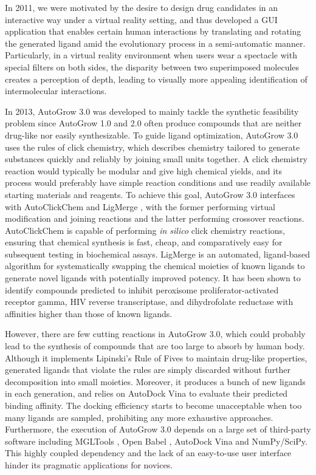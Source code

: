 In 2011, we were motivated by the desire to design drug candidates in an interactive way under a virtual reality setting, and thus developed a GUI application \citep{1265} that enables certain human interactions by translating and rotating the generated ligand amid the evolutionary process in a semi-automatic manner. Particularly, in a virtual reality environment when users wear a spectacle with special filters on both sides, the disparity between two superimposed molecules creates a perception of depth, leading to visually more appealing identification of intermolecular interactions.

In 2013, AutoGrow 3.0 \citep{1354} was developed to mainly tackle the synthetic feasibility problem since AutoGrow 1.0 and 2.0 often produce compounds that are neither drug-like nor easily synthesizable. To guide ligand optimization, AutoGrow 3.0 uses the rules of click chemistry, which describes chemistry tailored to generate substances quickly and reliably by joining small units together. A click chemistry reaction would typically be modular and give high chemical yields, and its process would preferably have simple reaction conditions and use readily available starting materials and reagents. To achieve this goal, AutoGrow 3.0 interfaces with AutoClickChem \citep{1051} and LigMerge \citep{1181}, with the former performing virtual modification and joining reactions and the latter performing crossover reactions. AutoClickChem \citep{1051} is capable of performing \textit{in silico} click chemistry reactions, ensuring that chemical synthesis is fast, cheap, and comparatively easy for subsequent testing in biochemical assays. LigMerge \citep{1181} is an automated, ligand-based algorithm for systematically swapping the chemical moieties of known ligands to generate novel ligands with potentially improved potency. It has been shown to identify compounds predicted to inhibit peroxisome proliferator-activated receptor gamma, HIV reverse transcriptase, and dihydrofolate reductase with affinities higher than those of known ligands.%

However, there are few cutting reactions in AutoGrow 3.0, which could probably lead to the synthesis of compounds that are too large to absorb by human body. Although it implements Lipinski's Rule of Fives \citep{169} to maintain drug-like properties, generated ligands that violate the rules are simply discarded without further decomposition into small moieties. Moreover, it produces a bunch of new ligands in each generation, and relies on AutoDock Vina \citep{595} to evaluate their predicted binding affinity. The docking efficiency starts to become unacceptable when too many ligands are sampled, prohibiting any more exhaustive approaches. Furthermore, the execution of AutoGrow 3.0 depends on a large set of third-party software including MGLTools \citep{596}, Open Babel \citep{968}, AutoDock Vina \citep{595} and NumPy/SciPy. This highly coupled dependency and the lack of an easy-to-use user interface hinder its pragmatic applications for novices.

